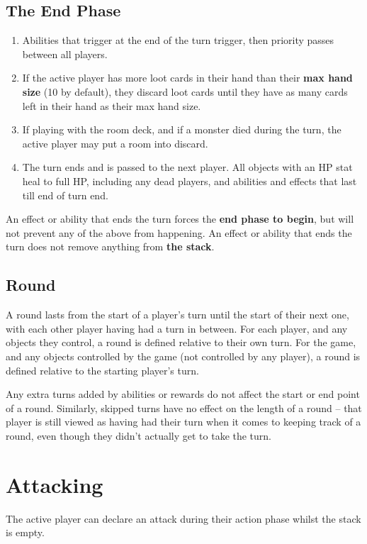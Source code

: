 \documentclass[10pt, a4paper, twoside]{article} %
\begin{document}
    \subsection{The End Phase}
    \begin{enumerate}
        \item Abilities that trigger at the end of the turn trigger, then priority passes between all players.
        \item If the active player has more loot cards in their hand than their \textbf{max hand size} (10 by default), they discard loot cards until they have as many cards left in their hand as their max hand size.
        \item If playing with the room deck, and if a monster died during the turn, the active player may put a room into discard.
        \item The turn ends and is passed to the next player. All objects with an HP stat heal to full HP, including any dead players, and abilities and effects that last till end of turn end.
    \end{enumerate}
    An effect or ability that ends the turn forces the \textbf{end phase to begin}, but will not prevent any of the above from happening. An effect or ability that ends the turn does not remove anything from \textbf{the stack}.

    \subsection{Round}
    A round lasts from the start of a player’s turn until the start of their next one, with each other player having had a turn in between. For each player, and any objects they control, a round is defined relative to their own turn. For the game, and any objects controlled by the game (not controlled by any player), a round is defined relative to the starting player’s turn.

    Any extra turns added by abilities or rewards do not affect the start or end point of a round. Similarly, skipped turns have no effect on the length of a round – that player is still viewed as having had their turn when it comes to keeping track of a round, even though they didn’t actually get to take the turn.

    \section{Attacking}
    \label{attacking}
    The active player can declare an attack during their action phase whilst the stack is empty.
\end{document}
